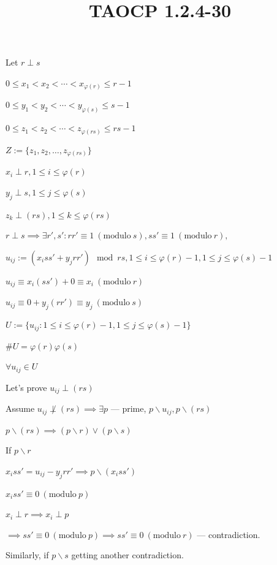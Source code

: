 \documentclass{article}
\title{TAOCP 1.2.4\mbox{-}30}
\begin{document}
\maketitle

Let \( r \perp s \)

\( 0 \leq x_{1} < x_{2} < \cdots < x_{\varphi(r)} \leq r - 1 \)

\( 0 \leq y_{1} < y_{2} < \cdots < y_{\varphi(s)} \leq s - 1 \)

\( 0 \leq z_{1} < z_{2} < \cdots < z_{\varphi(rs)} \leq rs - 1 \)

\( Z := \{ z_{1}, z_{2}, \ldots, z_{\varphi(rs)} \} \)

\( x_{i} \perp r, 1 \leq i \leq \varphi(r) \)

\( y_{j} \perp s, 1 \leq j \leq \varphi(s) \)

\( z_{k} \perp (rs), 1 \leq k \leq \varphi(rs) \)

\( r \perp s \implies \exists r',s': rr' \equiv 1 \ (\mathrm{modulo}\ s), ss' \equiv 1 \ (\mathrm{modulo}\ r), \)

\( u_{ij} := (x_{i}ss' + y_{j}rr') \mod rs, 1 \leq i \leq \varphi(r) - 1, 1 \leq j \leq \varphi(s) - 1 \)

\( u_{ij} \equiv x_{i}(ss') + 0 \equiv x_{i}\ (\mathrm{modulo}\ r) \)

\( u_{ij} \equiv 0 + y_{j}(rr') \equiv y_{j}\ (\mathrm{modulo}\ s) \)

\( U := \{ u_{ij}: 1 \leq i \leq \varphi(r) - 1, 1 \leq j \leq \varphi(s) - 1 \} \)

\( \#U = \varphi(r)\varphi(s) \)

\( \forall u_{ij} \in U \)

Let's prove \( u_{ij} \perp (rs) \)

Assume \( u_{ij} \not\perp (rs) \implies \exists p \) --- prime, \( p \backslash u_{ij}, p \backslash (rs) \)

\( p \backslash (rs) \implies (p \backslash r) \lor (p \backslash s) \)

If \( p \backslash r \)

\( x_{i} ss' = u_{ij} - y_{j} rr' \implies p \backslash (x_{i} ss') \)

\( x_{i} ss' \equiv 0\ (\mathrm{modulo}\ p) \)

\( x_{i} \perp r \implies x_{i} \perp p \)

\( \implies ss' \equiv 0\ (\mathrm{modulo}\ p) \implies ss' \equiv 0\ (\mathrm{modulo}\ r) \) --- contradiction.

Similarly, if \( p \backslash s \) getting another contradiction.
\end{document}
